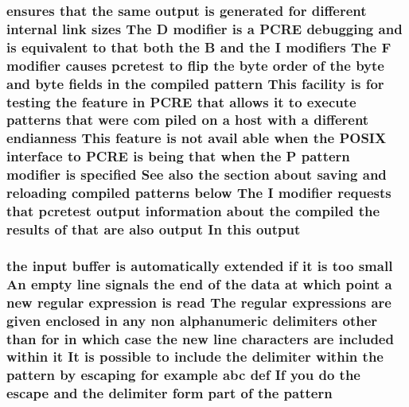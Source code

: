 \subsubsection[{\texorpdfstring{output}{output}}]{ ensures that the same output {\bf is} {\bf generated} for different internal link sizes The {\bf D} {\bf modifier} {\bf is} {\bf a} {\bf P\+C\+RE} debugging and {\bf is} equivalent {\bf to} that both the {\bf B} and the {\bf I} {\bf modifiers} The {\bf F} {\bf modifier} causes {\bf pcretest} {\bf to} flip the byte {\bf order} {\bf of} the byte and byte {\bf fields} {\bf in} the {\bf compiled} {\bf pattern} This {\bf facility} {\bf is} for testing the {\bf feature} {\bf in} {\bf P\+C\+RE} that allows {\bf it} {\bf to} execute {\bf patterns} that were com piled {\bf on} {\bf a} {\bf host} {\bf with} {\bf a} different endianness This {\bf feature} {\bf is} {\bf not} avail {\bf able} when the P\+O\+S\+IX interface {\bf to} {\bf P\+C\+RE} {\bf is} being that when the P {\bf pattern} {\bf modifier} {\bf is} {\bf specified} See also the {\bf section} about saving and reloading {\bf compiled} {\bf patterns} {\bf below} The {\bf I} {\bf modifier} {\bf requests} that {\bf pcretest} output information about the {\bf compiled} the {\bf results} {\bf of} that {\bf are} also output In {\bf this} output}\hypertarget{pcretest_8txt_acf47d950a4853a501d6b975b394de5e5}{}\label{pcretest_8txt_acf47d950a4853a501d6b975b394de5e5}
\subsubsection[{\texorpdfstring{pattern}{pattern}}]{\setlength{\rightskip}{0pt plus 5cm}the {\bf input} {\bf buffer} {\bf is} automatically extended {\bf if} {\bf it} {\bf is} too small An {\bf empty} {\bf line} signals the {\bf end} {\bf of} the {\bf data} at {\bf which} {\bf point} {\bf a} new regular {\bf expression} {\bf is} {\bf read} The regular {\bf expressions} {\bf are} {\bf given} enclosed {\bf in} {\bf any} non {\bf alphanumeric} delimiters other {\bf than} for {\bf in} {\bf which} {\bf case} the new {\bf line} {\bf characters} {\bf are} {\bf included} within {\bf it} It {\bf is} {\bf possible} {\bf to} {\bf include} the delimiter within the pattern by escaping for {\bf example} {\bf abc} def If you {\bf do} the escape and the delimiter form part {\bf of} the pattern}\hypertarget{pcretest_8txt_afd7cdd51974521bae1bd520220502e58}{}\label{pcretest_8txt_afd7cdd51974521bae1bd520220502e58}
